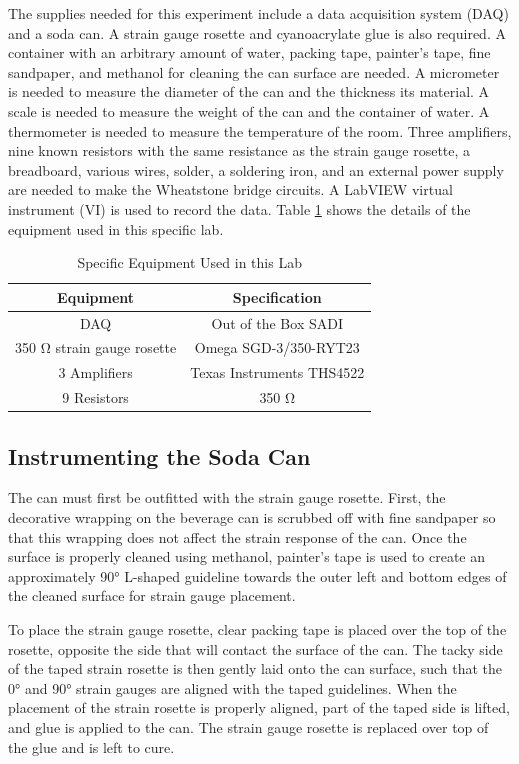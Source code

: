 \documentclass[10pt,journal,letterpaper]{IEEEtran}
\begin{document}
The supplies needed for this experiment include a data acquisition system (DAQ) and a soda can.
A strain gauge rosette and cyanoacrylate glue is also required.
A container with an arbitrary amount of water, packing tape, painter's tape, fine sandpaper, and methanol for cleaning the can surface are needed.
A micrometer is needed to measure the diameter of the can and the thickness its material.
A scale is needed to measure the weight of the can and the container of water.
A thermometer is needed to measure the temperature of the room.
Three amplifiers, nine known resistors with the same resistance as the strain gauge rosette, a breadboard, various wires, solder, a soldering iron, and an external power supply are needed to make the Wheatstone bridge circuits.
A LabVIEW virtual instrument (VI) is used to record the data.
Table \ref{tab:mats} shows the details of the equipment used in this specific lab.
\begin{table}[H]
\renewcommand\arraystretch{1.25}
\centering
\caption{Specific Equipment Used in this Lab}
\begin{tabular}{cc}
\hline \hline
Equipment & Specification \\
\hline
DAQ & Out of the Box SADI \\
350 \unit{\ohm} strain gauge rosette & Omega SGD-3/350-RYT23 \\
3 Amplifiers & Texas Instruments THS4522 \\
9 Resistors & 350 \unit{\ohm} \\
\hline \hline
\end{tabular}
\label{tab:mats}
\end{table}

\subsection{Instrumenting the Soda Can}

The can must first be outfitted with the strain gauge rosette.
First, the decorative wrapping on the beverage can is scrubbed off with fine sandpaper so that this wrapping does not affect the strain response of the can.
Once the surface is properly cleaned using methanol, painter's tape is used to create an approximately \ang{90} L-shaped guideline towards the outer left and bottom edges of the cleaned surface for strain gauge placement.

To place the strain gauge rosette, clear packing tape is placed over the top of the rosette, opposite the side that will contact the surface of the can.
The tacky side of the taped strain rosette is then gently laid onto the can surface, such that the \ang{0} and \ang{90} strain gauges are aligned with the taped guidelines.
When the placement of the strain rosette is properly aligned, part of the taped side is lifted, and glue is applied to the can.
The strain gauge rosette is replaced over top of the glue and is left to cure. 
\end{document}
